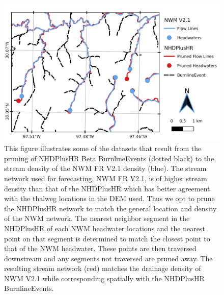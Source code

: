 \documentclass[draft]{dependencies/agujournal2019}
\begin{document}
\begin{figure}[H]
\centering
\includegraphics[scale=1.0]{figures/headwaters.jpg}
\caption{This figure illustrates some of the datasets that result from the pruning of NHDPlusHR Beta BurnlineEvents (dotted black) to the stream density of the NWM FR V2.1 density (blue).
The stream network used for forecasting, NWM FR V2.1, is of higher stream density than that of the NHDPlusHR which has better agreement with the thalweg locations in the DEM used.
Thus we opt to prune the NHDPlusHR network to match the general location and density of the NWM network.
The nearest neighbor segment in the NHDPlusHR of each NWM headwater locations and the nearest point on that segment is determined to match the closest point to that of the NWM headwater.
These points are then traversed downstream and any segments not traversed are pruned away.
The resulting stream network (red) matches the drainage density of NWM V2.1 while corresponding spatially with the NHDPlusHR BurnlineEvents.}
\label{fig:stream_density_pruning}
\end{figure}
%
\end{document}
